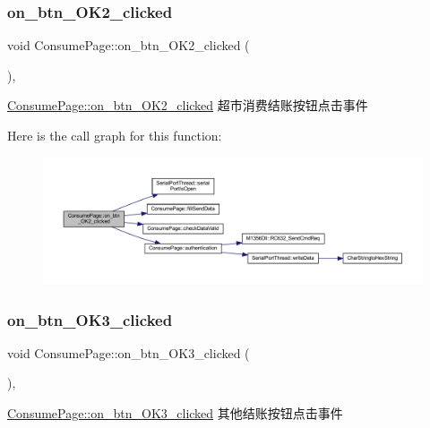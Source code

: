 \subsubsection{\texorpdfstring{on\_btn\_OK2\_clicked}{on\_btn\_OK2\_clicked}}
{\footnotesize\ttfamily void Consume\+Page\+::on\+\_\+btn\+\_\+\+O\+K2\+\_\+clicked (\begin{DoxyParamCaption}{ }\end{DoxyParamCaption})\hspace{0.3cm}{\ttfamily [private]}, {\ttfamily [slot]}}



\mbox{\hyperlink{class_consume_page_a9ace94ec565505f97e29f0f732ef13bf}{Consume\+Page\+::on\+\_\+btn\+\_\+\+O\+K2\+\_\+clicked}} 超市消费结账按钮点击事件 

Here is the call graph for this function\+:
\nopagebreak
\begin{figure}[H]
\begin{center}
\leavevmode
\includegraphics[width=350pt]{class_consume_page_a9ace94ec565505f97e29f0f732ef13bf_cgraph}
\end{center}
\end{figure}
\mbox{\label{class_consume_page_a3d244573d28510df3c7b3ca0d6eb3843}} 
\subsubsection{\texorpdfstring{on\_btn\_OK3\_clicked}{on\_btn\_OK3\_clicked}}
{\footnotesize\ttfamily void Consume\+Page\+::on\+\_\+btn\+\_\+\+O\+K3\+\_\+clicked (\begin{DoxyParamCaption}{ }\end{DoxyParamCaption})\hspace{0.3cm}{\ttfamily [private]}, {\ttfamily [slot]}}



\mbox{\hyperlink{class_consume_page_a3d244573d28510df3c7b3ca0d6eb3843}{Consume\+Page\+::on\+\_\+btn\+\_\+\+O\+K3\+\_\+clicked}} 其他结账按钮点击事件 


